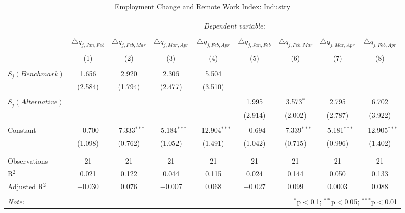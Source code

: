 
\begin{table}[!htbp] \centering 
  \caption{Employment Change and Remote Work Index: Industry} 
  \label{tab:regression_dynamics_industry} 
\footnotesize 
\begin{tabular}{@{\extracolsep{5pt}}lcccccccc} 
\\[-1.8ex]\hline 
\hline \\[-1.8ex] 
 & \multicolumn{8}{c}{\textit{Dependent variable:}} \\ 
\cline{2-9} 
\\[-1.8ex] & $\triangle q_{j,Jan,Feb}$ & $\triangle q_{j,Feb,Mar}$ & $\triangle q_{j,Mar,Apr}$ & $\triangle q_{j,Feb,Apr}$ & $\triangle q_{j,Jan,Feb}$ & $\triangle q_{j,Feb,Mar}$ & $\triangle q_{j,Mar,Apr}$ & $\triangle q_{j,Feb,Apr}$ \\ 
\\[-1.8ex] & (1) & (2) & (3) & (4) & (5) & (6) & (7) & (8)\\ 
\hline \\[-1.8ex] 
 $S_{j}(Benchmark)$ & 1.656 & 2.920 & 2.306 & 5.504 &  &  &  &  \\ 
  & (2.584) & (1.794) & (2.477) & (3.510) &  &  &  &  \\ 
  & & & & & & & & \\ 
 $S_{j}(Alternative)$ &  &  &  &  & 1.995 & 3.573$^{*}$ & 2.795 & 6.702 \\ 
  &  &  &  &  & (2.914) & (2.002) & (2.787) & (3.922) \\ 
  & & & & & & & & \\ 
 Constant & $-$0.700 & $-$7.333$^{***}$ & $-$5.184$^{***}$ & $-$12.904$^{***}$ & $-$0.694 & $-$7.339$^{***}$ & $-$5.181$^{***}$ & $-$12.905$^{***}$ \\ 
  & (1.098) & (0.762) & (1.052) & (1.491) & (1.042) & (0.715) & (0.996) & (1.402) \\ 
  & & & & & & & & \\ 
\hline \\[-1.8ex] 
Observations & 21 & 21 & 21 & 21 & 21 & 21 & 21 & 21 \\ 
R$^{2}$ & 0.021 & 0.122 & 0.044 & 0.115 & 0.024 & 0.144 & 0.050 & 0.133 \\ 
Adjusted R$^{2}$ & $-$0.030 & 0.076 & $-$0.007 & 0.068 & $-$0.027 & 0.099 & 0.0003 & 0.088 \\ 
\hline 
\hline \\[-1.8ex] 
\textit{Note:}  & \multicolumn{8}{r}{$^{*}$p$<$0.1; $^{**}$p$<$0.05; $^{***}$p$<$0.01} \\ 
\end{tabular} 
\end{table} 
